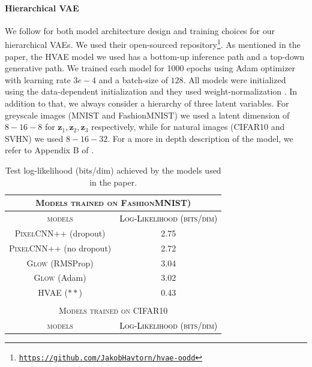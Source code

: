 {\paragraph{Hierarchical VAE} We follow \cite{havtorn_hierarchical_2021} for both model architecture design and training choices for our hierarchical VAEs. We used their open-sourced repository\footnote{\href{https://github.com/JakobHavtorn/hvae-oodd}{\texttt{https://github.com/JakobHavtorn/hvae-oodd}}}. As mentioned in the paper, the HVAE model we used has a bottom-up inference path and a top-down generative path. We trained each model for 1000 epochs using Adam optimizer with learning rate $3e-4$ and a batch-size of $128$. All models were initialized using the data-dependent initialization and they used weight-normalization \citep{salimans_weight_2016}. In addition to that, we always consider a hierarchy of three latent variables. For greyscale images (MNIST and FashionMNIST) we used a latent dimension of $8-16-8$ for $\mathbf{z}_1, \mathbf{z}_2, \mathbf{z}_3$ respectively, while for natural images (CIFAR10 and SVHN) we used $8-16-32$. For a more in depth description of the model, we refer to Appendix B of \textcite{havtorn_hierarchical_2021}.


\begin{table}[tb]
    \caption{Test log-likelihood (bits/dim) achieved by the models used in the paper.}
    \begin{subtable}{.5\textwidth}
        \centering
        \scriptsize
        \begin{tabular}{cc}
            \toprule
            \multicolumn{2}{c}{\textsc{Models trained on FashionMNIST)}}\\
            \midrule
            \textsc{models}  & \textcolor{black}{\textsc{Log-Likelihood (bits/dim)}}\\
            \midrule
            \textsc{PixelCNN++} (dropout) & 2.75 \\
            \textsc{PixelCNN++} (no dropout) & 2.72 \\
            \textsc{Glow} (RMSProp) &  3.04\\
            \textsc{Glow} (Adam)  & 3.02 \\
            \textsc{HVAE} ($**$) & 0.43 \\
            \bottomrule
            &   \\
            \toprule
            \multicolumn{2}{c}{\textsc{Models trained on CIFAR10}}\\
            \midrule
            \textsc{models}  & \textcolor{black}{\textsc{Log-Likelihood (bits/dim)}}\\
            \midrule
            

\end{tabular}
\end{subtable}
\end{table}}
